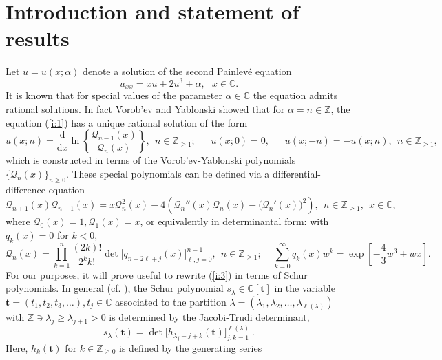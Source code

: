 \documentclass[10pt,reqno,oneside]{amsart}
\renewcommand{\d}{{\mathrm d}}
\numberwithin{equation}{section}
\newtheorem{theo}{Theorem}[section]
\def\bt{\begin{theo}}
\def\be{\begin{equation}}
\def\ee{\end{equation}}
\def\eqref#1{(\ref{#1})}
\def\bt{{\mathbf t}}
\begin{document}
\section{Introduction and statement of results}
Let $u=u(x;\alpha)$ denote a solution of the second Painlev\'e equation
\begin{equation}\label{i:1}
	u_{xx}=xu+2u^3+\alpha,\ \ \ x\in\mathbb{C}.
\end{equation}
It is known that for special values of the parameter $\alpha\in\mathbb{C}$ the equation admits  rational solutions.  In fact Vorob'ev and Yablonski \cite{V,Ya} showed that for $\alpha=n\in\mathbb{Z}$, the equation \eqref{i:1} has a unique rational solution of the form
\begin{equation}\label{i:2}
	u(x;n) = \frac{\d}{\d x}\ln\left\{\frac{\mathcal{Q}_{n-1}(x)}{\mathcal{Q}_n(x)}\right\},\ \ n\in\mathbb{Z}_{\geq 1};\ \ \ \ \ \ \ u(x;0)=0,\ \ \ \ \ \ \ u(x;-n)=-u(x;n),\ \ n\in\mathbb{Z}_{\geq 1},
\end{equation}
which is constructed in terms of the Vorob'ev-Yablonski polynomials $\{\mathcal{Q}_n(x)\}_{n\geq 0}$. These special polynomials can be defined via a differential-difference equation
\begin{equation}\label{i:0}
	\mathcal{Q}_{n+1}(x)\mathcal{Q}_{n-1}(x)=x\mathcal{Q}_n^2(x)-4\left(\mathcal{Q}_n''(x)\mathcal{Q}_n(x)-\big(\mathcal{Q}_n'(x)\big)^2\right),\ \ n\in\mathbb{Z}_{\geq 1},\ \ x\in\mathbb{C},
\end{equation}
where $\mathcal{Q}_0(x)=1,\mathcal{Q}_1(x)=x$, or equivalently \cite{KO} in determinantal form: with $q_k(x)=0$ for $k<0$,
\begin{equation}\label{i:3}
	\mathcal{Q}_n(x) = \prod_{k=1}^n\frac{(2k)!}{2^kk!}  \det\Big[q_{n-2\ell+j}(x)\Big]_{\ell,j=0}^{n-1},\ \ n\in\mathbb{Z}_{\geq 1};\ \ \ \ \ \sum_{k=0}^{\infty}q_k(x)w^k=\exp\left[-\frac{4}{3}w^3+wx\right].
\end{equation}
For our purposes, it will prove useful to rewrite \eqref{i:3} in terms of Schur polynomials. In general (cf. \cite{M}), the Schur polynomial $s_{\lambda}\in\mathbb{C}[\mathbf{t}]$ in the variable $\mathbf{t}=(t_1,t_2,t_3,\ldots), t_j\in\mathbb{C}$ associated to the partition $\lambda=(\lambda_1,\lambda_2,\ldots,\lambda_{\ell(\lambda)})$ with $\mathbb{Z}\ni\lambda_j\geq\lambda_{j+1}>0$ is determined by the Jacobi-Trudi determinant,
\be
\label{JTrudi}
s_{\lambda}(\bt) = \det\big[h_{\lambda_j-j+k}(\bt)\big]_{j,k=1}^{\ell(\lambda)}\ .
\ee
Here, $h_k(\mathbf{t})$ for $k\in\mathbb{Z}_{\geq 0}$ is defined by the generating series
\end{document}
